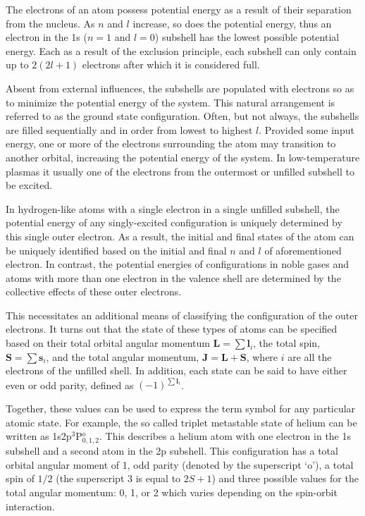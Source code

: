 The electrons of an atom possess potential energy as a result of their
separation from the nucleus. As $n$ and $l$ increase, so does the potential
energy, thus an electron in the 1s ($n=1$ and $l=0$) subshell has the lowest
possible potential energy. Each as a result of the exclusion principle, each
subshell can only contain up to $2(2l+1)$ electrons after which it is considered
full.

Absent from external influences, the subshells are populated with electrons so
as to minimize the potential energy of the system. This natural arrangement is
referred to as the ground state configuration. Often, but not always, the
subshells are filled sequentially and in order from lowest to highest $l$.
Provided some input energy, one or more of the electrons surrounding the atom
may transition to another orbital, increasing the potential energy of the
system. In low-temperature plasmas it usually one of the electrons from the
outermost or unfilled subshell to be excited.

In hydrogen-like atoms with a single electron in a single unfilled subshell, the
potential energy of any singly-excited configuration is uniquely determined by
this single outer electron. As a result, the initial and final states of the
atom can be uniquely identified based on the initial and final $n$ and $l$ of
aforementioned electron. In contrast, the potential energies of configurations
in noble gases and atoms with more than one electron in the valence shell are
determined by the collective effects of these outer electrons.

This necessitates an additional means of classifying the configuration of the
outer electrons. It turns out that the state of these types of atoms can be
specified based on their total orbital angular momentum $\bm{L}=\sum \bm{l}_i$,
the total spin, $\bm{S}=\sum \bm{s}_i$, and the total angular momentum,
$\bm{J}=\bm{L}+\bm{S}$, where $i$ are all the electrons of the unfilled shell.
In addition, each state can be said to have either even or odd parity, defined
as $(-1)^{\sum\bm{l}_i}$.

Together, these values can be used to express the term symbol for any particular
atomic state. For example, the so called triplet metastable state of helium can
be written as 1s2p$^3$P$^o_{0,1,2}$. This describes a helium atom with one
electron in the 1s subshell and a second atom in the 2p subshell. This
configuration has a total orbital angular moment of 1, odd parity (denoted by
the superscript `o'), a total spin of $1/2$ (the superscript $3$ is equal to
$2S+1$) and three possible values for the total angular momentum: 0, 1, or 2
which varies depending on the spin-orbit interaction.

